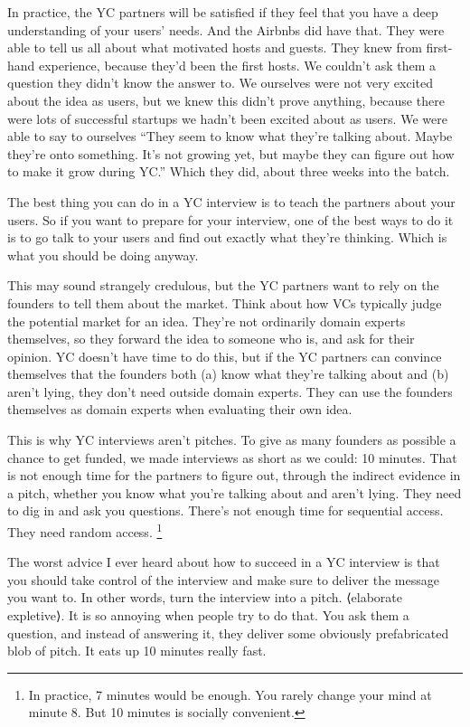 In practice, the YC partners will be satisfied if they feel that you
have a deep understanding of your users' needs. And the Airbnbs did have
that. They were able to tell us all about what motivated hosts and
guests. They knew from first-hand experience, because they'd been the
first hosts. We couldn't ask them a question they didn't know the answer
to. We ourselves were not very excited about the idea as users, but we
knew this didn't prove anything, because there were lots of successful
startups we hadn't been excited about as users. We were able to say to
ourselves ``They seem to know what they're talking about. Maybe they're
onto something. It's not growing yet, but maybe they can figure out how
to make it grow during YC.'' Which they did, about three weeks into the
batch.

The best thing you can do in a YC interview is to teach the partners
about your users. So if you want to prepare for your interview, one of
the best ways to do it is to go talk to your users and find out exactly
what they're thinking. Which is what you should be doing anyway.

This may sound strangely credulous, but the YC partners want to rely on
the founders to tell them about the market. Think about how VCs
typically judge the potential market for an idea. They're not ordinarily
domain experts themselves, so they forward the idea to someone who is,
and ask for their opinion. YC doesn't have time to do this, but if the
YC partners can convince themselves that the founders both (a) know what
they're talking about and (b) aren't lying, they don't need outside
domain experts. They can use the founders themselves as domain experts
when evaluating their own idea.

This is why YC interviews aren't pitches. To give as many founders as
possible a chance to get funded, we made interviews as short as we
could: 10 minutes. That is not enough time for the partners to figure
out, through the indirect evidence in a pitch, whether you know what
you're talking about and aren't lying. They need to dig in and ask you
questions. There's not enough time for sequential access. They need
random access. \footnote{In practice, 7 minutes would be enough. You rarely change your
mind at minute 8. But 10 minutes is socially convenient.}

The worst advice I ever heard about how to succeed in a YC interview is
that you should take control of the interview and make sure to deliver
the message you want to. In other words, turn the interview into a
pitch. ⟨elaborate expletive⟩. It is so annoying when people try to do
that. You ask them a question, and instead of answering it, they deliver
some obviously prefabricated blob of pitch. It eats up 10 minutes really
fast.

